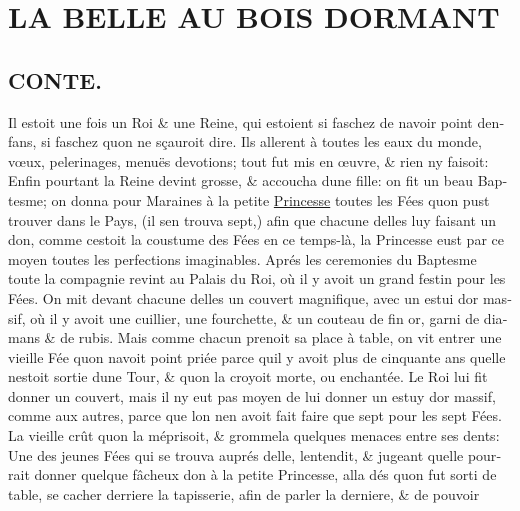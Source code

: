 \documentclass[14pt,a4paper]{memoir}
\newcommand{\ul}[1]{\uline{#1}}
\begin{document}
\begin{otherlanguage}{french}
\begin{itshape}
\end{itshape}

\chapter{LA BELLE AU BOIS DORMANT}

\section{CONTE.}

Il estoit une fois un Roi \& une Reine, qui estoient si faschez de
n\textquotesingle avoir point d\textquotesingle enfans, si faschez
qu\textquotesingle on ne sçauroit dire. Ils allerent à toutes les eaux
du monde, vœux, pelerinages, menuës devotions; tout fut mis en œuvre, \&
rien n\textquotesingle y faisoit: Enfin pourtant la Reine devint grosse,
\& accoucha d\textquotesingle une fille: on fit un beau Baptesme; on
donna pour Maraines à la petite \ul{Princesse} toutes les Fées
qu\textquotesingle on pust trouver dans le Pays, (il
s\textquotesingle en trouva sept,) afin que chacune
d\textquotesingle elles luy faisant un don, comme
c\textquotesingle estoit la coustume des Fées en ce temps-là, la
Princesse eust par ce moyen toutes les perfections imaginables. Aprés
les ceremonies du Baptesme toute la compagnie revint au Palais du Roi,
où il y avoit un grand festin pour les Fées. On mit devant chacune
d\textquotesingle elles un couvert magnifique, avec un estui
d\textquotesingle or massif, où il y avoit une cuillier, une fourchette,
\& un couteau de fin or, garni de diamans \& de rubis. Mais comme chacun
prenoit sa place à table, on vit entrer une vieille Fée
qu\textquotesingle on n\textquotesingle avoit point priée parce
qu\textquotesingle il y avoit plus de cinquante ans
qu\textquotesingle elle n\textquotesingle estoit sortie
d\textquotesingle une Tour, \& qu\textquotesingle on la croyoit morte,
ou enchantée. Le Roi lui fit donner un couvert, mais il
n\textquotesingle y eut pas moyen de lui donner un estuy
d\textquotesingle or massif, comme aux autres, parce que
l\textquotesingle on n\textquotesingle en avoit fait faire que sept pour
les sept Fées. La vieille crût qu\textquotesingle on la méprisoit, \&
grommela quelques menaces entre ses dents: Une des jeunes Fées qui se
trouva auprés d\textquotesingle elle, l\textquotesingle entendit, \&
jugeant qu\textquotesingle elle pourrait donner quelque fâcheux don à la
petite Princesse, alla dés qu\textquotesingle on fut sorti de table, se
cacher derriere la tapisserie, afin de parler la derniere, \& de pouvoir

\end{otherlanguage}
\end{document}
